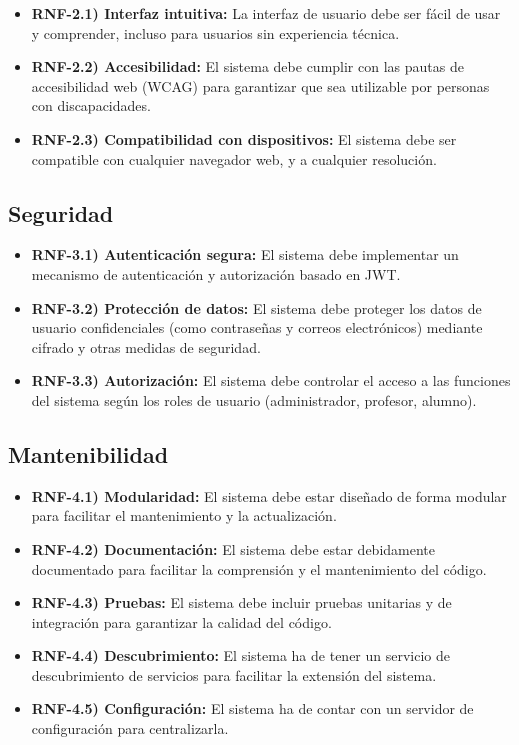\begin{itemize}
    \item \textbf{RNF-2.1) Interfaz intuitiva:} La interfaz de usuario debe ser fácil de usar y comprender, incluso para usuarios sin experiencia técnica.
    \item \textbf{RNF-2.2) Accesibilidad:} El sistema debe cumplir con las pautas de accesibilidad web (WCAG) para garantizar que sea utilizable por personas con discapacidades.
    \item \textbf{RNF-2.3) Compatibilidad con dispositivos:} El sistema debe ser compatible con cualquier navegador web, y a cualquier resolución.
\end{itemize}

\subsection{Seguridad}

\begin{itemize}
    \item \textbf{RNF-3.1) Autenticación segura:} El sistema debe implementar un mecanismo de autenticación y autorización basado en JWT.
    \item \textbf{RNF-3.2) Protección de datos:} El sistema debe proteger los datos de usuario confidenciales (como contraseñas y correos electrónicos) mediante cifrado y otras medidas de seguridad.
    \item \textbf{RNF-3.3) Autorización:} El sistema debe controlar el acceso a las funciones del sistema según los roles de usuario (administrador, profesor, alumno).
\end{itemize}

\subsection{Mantenibilidad}

\begin{itemize}
    \item \textbf{RNF-4.1) Modularidad:} El sistema debe estar diseñado de forma modular para facilitar el mantenimiento y la actualización.
    \item \textbf{RNF-4.2) Documentación:} El sistema debe estar debidamente documentado para facilitar la comprensión y el mantenimiento del código.
    \item \textbf{RNF-4.3) Pruebas:} El sistema debe incluir pruebas unitarias y de integración para garantizar la calidad del código.
    \item \textbf{RNF-4.4) Descubrimiento:} El sistema ha de tener un servicio de descubrimiento de servicios para facilitar la extensión del sistema.
    \item \textbf{RNF-4.5) Configuración:} El sistema ha de contar con un servidor de configuración para centralizarla.
\end{itemize}

